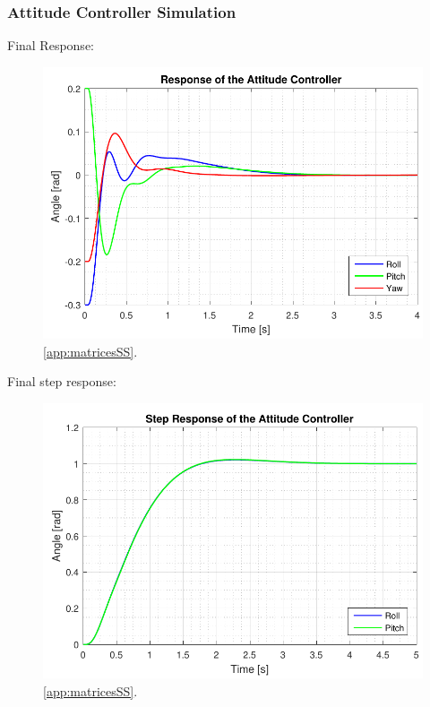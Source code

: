 \subsubsection{Attitude Controller Simulation}

Final Response:

\begin{figure}[H]
	\centering
	\includegraphics[scale=0.8]{figures/ssFinalEq.pdf}
	\caption{ \autoref{app:matricesSS}.}
	\label{fig:TranslationalControlDiagram}
\end{figure}


Final step response:

\begin{figure}[H]
	\centering
	\includegraphics[scale=0.8]{figures/ssFinalStep.pdf}
	\caption{\autoref{app:matricesSS}.}
	\label{fig:TranslationalControlDiagram}
\end{figure}

